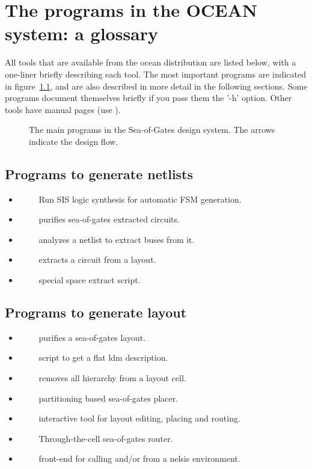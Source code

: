 \chapter{The programs in the OCEAN system: a glossary}
\label{s-programs}
All tools that are available from the {\sc ocean} distribution are listed
below, with a one-liner briefly describing each tool. The most important
programs are indicated in figure~\ref{oceantools2}, and are also described in
more detail in the following sections. 
Some programs
document themselves briefly if you pass them the '-h' option.
Other tools have manual pages (use ).
\begin{figure}
\centerline{}
\caption{\label{oceantools2} The main programs in the  Sea-of-Gates
design system. The arrows indicate the design flow.}
\end{figure}

\newcommand{\bprogs}{\begin{itemize}}
\newcommand{\prog}[2]{\item[~~~ \tool{#1}] ~~~~ #2}
\newcommand{\eprogs}{\end{itemize}}

\section{Programs to generate netlists}
\bprogs
\prog{kissis}{Run SIS logic synthesis for automatic FSM generation.}
\prog{ghoti}{purifies sea-of-gates extracted circuits.}
\prog{makebus}{analyzes a netlist to extract buses from it.}
\prog{space}{extracts a circuit from a layout.}
\prog{vspace}{special space extract script.}
\eprogs

\section{Programs to generate layout}
\bprogs
\prog{fish}{purifies a sea-of-gates layout.}
\prog{getldm}{script to get a flat ldm description.}
\prog{layflat}{removes all hierarchy from a layout cell.}
\prog{madonna}{partitioning based sea-of-gates placer.}
\prog{seadali}{interactive tool for layout editing, placing and routing.}
\prog{trout}{Through-the-cell sea-of-gates router.}
\prog{sea}{front-end for calling  and/or \tool{trout} from a nelsis environment.}
\eprogs

